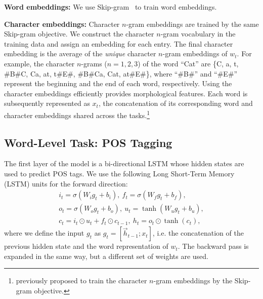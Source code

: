 \documentclass[11pt,a4paper]{article}
\begin{document}
\noindent
{\bf Word embeddings:}
We use Skip-gram~\citep{mikolov2013word2vec} to train word embeddings.

\noindent
{\bf Character embeddings:}
Character $n$-gram embeddings are trained by the same Skip-gram objective.
We construct the character $n$-gram vocabulary in the training data and assign an embedding for each entry.
The final character embedding is the average of the {\it unique} character $n$-gram embeddings of  $w_t$.
For example, the character $n$-grams ($n=1, 2, 3$) of the word ``Cat'' are \{C, a, t, \#B\#C, Ca, at, t\#E\#, \#B\#Ca, Cat, at\#E\#\}, where ``\#B\#'' and ``\#E\#'' represent the beginning and the end of each word, respectively.
Using the character embeddings efficiently provides morphological features.
Each word is subsequently represented as $x_t$, the concatenation of its corresponding word and character embeddings shared across the tasks.\footnote{\citet{char2017} previously proposed to train the character $n$-gram embeddings by the Skip-gram objective.}


\subsection{Word-Level Task: POS Tagging}
The first layer of the model is a bi-directional LSTM \citep{graves2005bilstm,hochreiter1997lstm} whose hidden states are used to predict POS tags.
We use the following Long Short-Term Memory (LSTM) units for the forward direction:
\begin{eqnarray}\label{eq:lstm}
i_{t}=\sigma\left(W_{i}g_{t}+b_{i}\right),~f_{t}=\sigma\left(W_{f}g_{t}+b_{f}\right),\nonumber\\
o_{t}=\sigma\left(W_{o}g_{t}+b_{o}\right),~u_{t}=\tanh\left(W_{u}g_{t}+b_{u}\right),\\
c_{t}=i_{t}\odot u_{t}+f_{t}\odot c_{t-1},~h_{t}=o_{t}\odot\tanh\left(c_{t}\right),\nonumber
\end{eqnarray}
where we define the input $g_t$ as $g_t=[\overrightarrow{h}_{t-1}; x_{t}]$, i.e. the concatenation of the previous hidden state and the word representation of $w_t$.
The backward pass is expanded in the same way, but a different set of weights are used.
\end{document}
